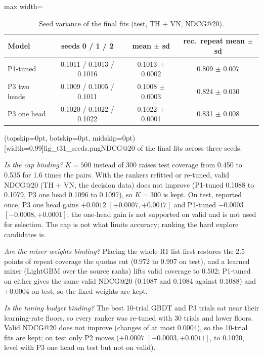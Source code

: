 \documentclass{ieeeaccess}
\begin{document}
\begin{table}[t]
\caption{Seed variance of the final fits (test, TH + VN, NDCG@20).}
\label{tab:seeds}
\setlength{\tabcolsep}{3pt}
\centering
\begin{adjustbox}{max width=\columnwidth}
\begin{tabular}{lccc}
\toprule
Model & seeds 0 / 1 / 2 & mean $\pm$ sd & rec.\ repeat mean $\pm$ sd \\
\midrule
P1-tuned     & 0.1011 / 0.1013 / 0.1016 & 0.1013 $\pm$ 0.0002 & 0.809 $\pm$ 0.007 \\
P3 two heads & 0.1009 / 0.1005 / 0.1011 & 0.1008 $\pm$ 0.0003 & 0.824 $\pm$ 0.030 \\
P3 one head  & 0.1020 / 0.1022 / 0.1022 & 0.1022 $\pm$ 0.0001 & 0.831 $\pm$ 0.008 \\
\bottomrule
\end{tabular}
\end{adjustbox}
\end{table}

\Figure[t!](topskip=0pt, botskip=0pt, midskip=0pt)[width=0.99\columnwidth]{fig_t31_seeds.png}{NDCG@20 of the final fits across three seeds.\label{fig:seeds}}

\textit{Is the cap binding?} $K = 500$ instead of 300 raises test coverage from 0.450 to 0.535 for 1.6 times the pairs. With the
rankers refitted or re-tuned, valid NDCG@20 (TH + VN, the decision data) does not improve (P1-tuned 0.1088 to 0.1079, P3 one head
0.1096 to 0.1097), so $K = 300$ is kept. On test, reported once, P3 one head gains $+0.0012$ $[+0.0007, +0.0017]$ and P1-tuned
$-0.0003$ $[-0.0008, +0.0001]$; the one-head gain is not supported on valid and is not used for selection. The cap is not what
limits accuracy; ranking the hard explore candidates is.

\textit{Are the mixer weights binding?} Placing the whole R1 list first restores the 2.5 points of repeat coverage the quotas cut
(0.972 to 0.997 on test), and a learned mixer (LightGBM over the source ranks) lifts valid coverage to 0.502; P1-tuned on either
gives the same valid NDCG@20 (0.1087 and 0.1084 against 0.1088) and $+0.0004$ on test, so the fixed weights are kept.

\textit{Is the tuning budget binding?} The best 10-trial GBDT and P3 trials sat near their learning-rate floors, so every ranker
was re-tuned with 30 trials and lower floors. Valid NDCG@20 does not improve (changes of at most 0.0004), so the 10-trial fits are
kept; on test only P2 moves ($+0.0007$ $[+0.0003, +0.0011]$, to 0.1020, level with P3 one head on test but not on valid).
\end{document}

